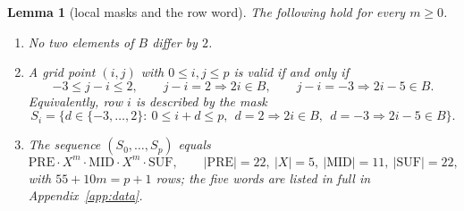\documentclass[11pt]{amsart}
\newtheorem{lemma}[theorem]{Lemma}
\theoremstyle{definition}
\theoremstyle{remark}
\begin{document}
\begin{lemma}[local masks and the row word]\label{lem:band}
The following hold for every $m\ge0$.
\begin{enumerate}
\item No two elements of $B$ differ by $2$.
\item A grid point $(i,j)$ with $0\le i,j\le p$ is valid if and only if
\[
-3\le j-i\le 2,\qquad j-i=2\Rightarrow 2i\in B,\qquad j-i=-3\Rightarrow 2i-5\in B .
\]
Equivalently, row $i$ is described by the mask
\[
S_i=\{d\in\{-3,\dots,2\}:\ 0\le i+d\le p,\ \ d=2\Rightarrow 2i\in B,\ \ d=-3\Rightarrow 2i-5\in B\}.
\]
\item The sequence $(S_0,\dots,S_p)$ equals
\[
\mathrm{PRE}\cdot X^m\cdot\mathrm{MID}\cdot X^m\cdot\mathrm{SUF},\qquad |\mathrm{PRE}|=22,\ |X|=5,\ |\mathrm{MID}|=11,\ |\mathrm{SUF}|=22,
\]
with $55+10m=p+1$ rows; the five words are listed in full in Appendix~\ref{app:data}.
\end{enumerate}
\end{lemma}
\end{document}
